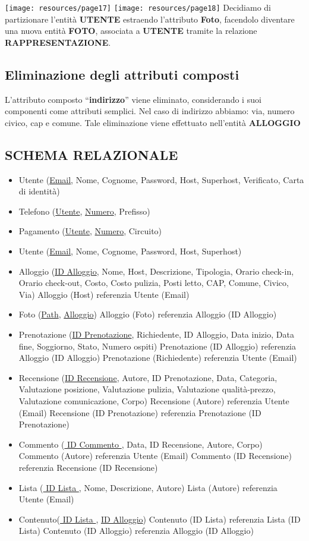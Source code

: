 \texttt{[image: resources/page17]}
\texttt{[image: resources/page18]}
Decidiamo di partizionare l'entità \textbf{UTENTE} estraendo l'attributo \textbf{Foto}, facendolo diventare una nuova entità \textbf{FOTO}, associata a \textbf{UTENTE} tramite la relazione \textbf{RAPPRESENTAZIONE}.

\subsection{Eliminazione degli attributi composti}
L’attributo composto “\textbf{indirizzo}” viene eliminato, considerando i suoi componenti come attributi semplici. Nel caso di indirizzo abbiamo: via, numero civico, cap e comune.
Tale eliminazione viene effettuato nell'entità \textbf{ALLOGGIO}


\subsection{SCHEMA RELAZIONALE}
\begin{itemize}
  \item Utente (\underline{Email}, Nome, Cognome, Password, Host, Superhost, Verificato, Carta di identità)
  \item Telefono (\underline{Utente}, \underline{Numero}, Prefisso)
  \item Pagamento (\underline{Utente}, \underline{Numero}, Circuito)
  \item Utente (\underline{Email}, Nome, Cognome, Password, Host, Superhost)
  \item Alloggio (\underline{ID Alloggio}, Nome, Host, Descrizione, Tipologia, Orario check-in, Orario check-out, Costo, Costo pulizia, Posti letto, CAP, Comune, Civico, Via)
        Alloggio (Host) referenzia Utente (Email)
  \item Foto (\underline{Path}, \underline{Alloggio})
        Alloggio (Foto) referenzia Alloggio (ID Alloggio)
  \item Prenotazione (\underline{ID Prenotazione}, Richiedente, ID Alloggio, Data inizio, Data fine, Soggiorno, Stato, Numero ospiti)
        Prenotazione (ID Alloggio) referenzia Alloggio (ID Alloggio)
        Prenotazione (Richiedente) referenzia Utente (Email)
  \item Recensione (\underline{ID Recensione}, Autore, ID Prenotazione, Data, Categoria, Valutazione posizione, Valutazione pulizia, Valutazione qualità-prezzo, Valutazione comunicazione, Corpo)
        Recensione (Autore) referenzia Utente (Email)
        Recensione (ID Prenotazione) referenzia Prenotazione (ID Prenotazione)
  \item Commento (\underline{ ID Commento }, Data, ID Recensione, Autore, Corpo)
        Commento (Autore) referenzia Utente (Email)
        Commento (ID Recensione) referenzia Recensione (ID Recensione)
  \item Lista (\underline{ ID Lista }, Nome, Descrizione, Autore)
        Lista (Autore) referenzia Utente (Email)
  \item Contenuto(\underline{ ID Lista }, \underline{ID Alloggio})
        Contenuto (ID Lista) referenzia Lista (ID Lista)
        Contenuto (ID Alloggio) referenzia Alloggio (ID Alloggio)
\end{itemize}